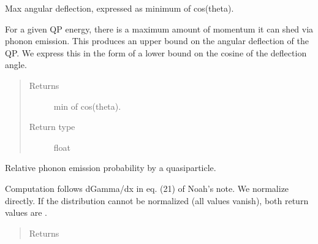 \documentclass[letterpaper,10pt,english]{sphinxmanual}
\begin{document}
\begin{fulllineitems}
\begin{fulllineitems}
\begin{quote}
\begin{description}
\end{description}\end{quote}

\end{fulllineitems}


\begin{fulllineitems}
\label{\detokenize{code_structure:scdc.interaction.QuasiparticlePhononEmission.min_cos_deflection}}
Max angular deflection, expressed as minimum of cos(theta).

For a given QP energy, there is a maximum amount of momentum it can
shed via phonon emission. This produces an upper bound on the angular
deflection of the QP. We express this in the form of a lower bound on
the cosine of the deflection angle.
\begin{quote}\begin{description}
\item[{Returns}] \leavevmode
min of cos(theta).

\item[{Return type}] \leavevmode
float

\end{description}\end{quote}

\end{fulllineitems}


\begin{fulllineitems}
\label{\detokenize{code_structure:scdc.interaction.QuasiparticlePhononEmission.phonon_energy_distribution}}
Relative phonon emission probability by a quasiparticle.

Computation follows dGamma/dx in eq. (21) of Noah’s note. We normalize
directly. If the distribution cannot be normalized (all values vanish),
both return values are .
\begin{quote}\begin{description}
\item[{Returns}] \leavevmode


\end{description}
\end{quote}
\end{fulllineitems}
\end{fulllineitems}
\end{document}
